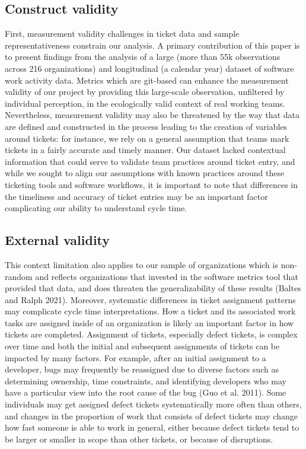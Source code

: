 \documentclass[
]{article}
\begin{document}
\subsection{Construct validity}\label{construct-validity}

First, measurement validity challenges in ticket data and sample
representativeness constrain our analysis. A primary contribution of
this paper is to present findings from the analysis of a large (more
than 55k observations across 216 organizations) and longitudinal (a
calendar year) dataset of software work activity data. Metrics which are
git-based can enhance the measurement validity of our project by
providing this large-scale observation, unfiltered by individual
perception, in the ecologically valid context of real working teams.
Nevertheless, measurement validity may also be threatened by the way
that data are defined and constructed in the process leading to the
creation of variables around tickets: for instance, we rely on a general
assumption that teams mark tickets in a fairly accurate and timely
manner. Our dataset lacked contextual information that could serve to
validate team practices around ticket entry, and while we sought to
align our assumptions with known practices around these ticketing tools
and software workflows, it is important to note that differences in the
timeliness and accuracy of ticket entries may be an important factor
complicating our ability to understand cycle time.

\subsection{External validity}\label{external-validity}

This context limitation also applies to our sample of organizations
which is non-random and reflects organizations that invested in the
software metrics tool that provided that data, and does threaten the
generalizability of these results (Baltes and Ralph 2021). Moreover,
systematic differences in ticket assignment patterns may complicate
cycle time interpretations. How a ticket and its associated work tasks
are assigned inside of an organization is likely an important factor in
how tickets are completed. Assignment of tickets, especially defect
tickets, is complex over time and both the initial and subsequent
assignments of tickets can be impacted by many factors. For example,
after an initial assignment to a developer, bugs may frequently be
reassigned due to diverse factors such as determining ownership, time
constraints, and identifying developers who may have a particular view
into the root cause of the bug (Guo et al. 2011). Some individuals may
get assigned defect tickets systematically more often than others, and
changes in the proportion of work that consists of defect tickets may
change how fast someone is able to work in general, either because
defect tickets tend to be larger or smaller in scope than other tickets,
or because of disruptions.
\end{document}
